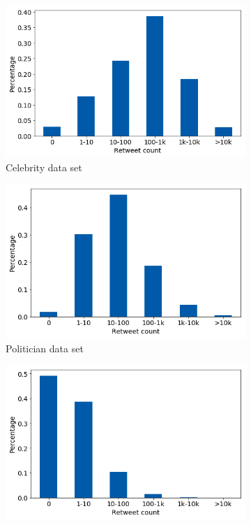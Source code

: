 \begin{figure}[h]
\begin{subfigure}{.45\textwidth}
  \includegraphics[width=.95\linewidth]{img/celeb_retw_distr}
  \caption{Celebrity data set}
  \label{fig:retw_distr_sub1}
\end{subfigure}%
\begin{subfigure}{.45\textwidth}
  \includegraphics[width=.95\linewidth]{img/polit_retw_distr}
  \caption{Politician data set}
  \label{fig:retw_distr_sub2}
\end{subfigure}
\begin{subfigure}{.45\textwidth}
  \includegraphics[width=.95\linewidth]{img/corp_retw_distr}

\end{subfigure}
\end{figure}
